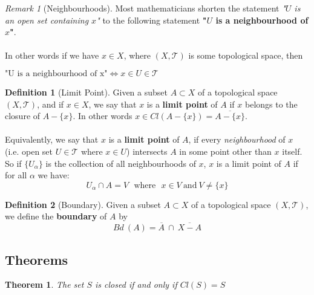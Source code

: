 \documentclass{article}
\newtheorem{theorem}{Theorem}[section]
\theoremstyle{remark}
\newtheorem*{remark}{Remark}
\theoremstyle{definition}
\newtheorem{definition}{Definition}[section]
\begin{document}
\medskip

\begin{remark}[Neighbourhoods]
Most mathematicians shorten the statement \textit{"$U$ is an open set containing $x$"} to the following statement \textbf{"$U$ is a neighbourhood of $x$"}.
\\ \\
In other words if we have $x \in X$, where $(X, \mathcal{T})$ is some topological space, then 
\begin{center}
$\text{"U \ is \ a \ neighbourhood \ of \ x"} \iff x \in U \in \mathcal{T}$ 
\end{center}
\end{remark}

\medskip

\newpage

\begin{definition}[Limit Point]
Given a subset $A \subset X$ of a topological space $(X , \mathcal{T})$, and if $x \in X$, we say that $x$ is a \textbf{limit point} of $A$ if $x$ belongs to the closure of $A - \{x\}$. In other words $x \in Cl\left(A - \{x\}\right) = \overline{A - \{x\}}$.
\\ \\
Equivalently, we say that $x$ is a \textbf{limit point} of $A$, if every \textit{neighbourhood} of $x$ (i.e. open set $U \in \mathcal{T}$ where $x \in U$) intersects $A$ in some point other than $x$ itself. \\
So if $\{U_{\alpha}\}$ is the collection of all neighbourhoods of $x$, $x$ is a limit point of $A$ if for all $\alpha$ we have: $$U_{\alpha} \cap A = V \ \ \ \text{where} \ \ \ x \in V \  \text{and} \  V \neq \{x\}$$
\end{definition}

\medskip

\begin{definition}[Boundary]
Given a subset $A \subset X$ of a topological space $(X , \mathcal{T})$, we define the \textbf{boundary} of $A$ by $$Bd \ (A) = \overline{A} \ \cap \ \overline{X-A}$$
\end{definition}

\newpage

\subsection{Theorems}

\begin{theorem}
The set $S$ is closed if and only if $Cl(S) = S$
\end{theorem}
\end{document}

